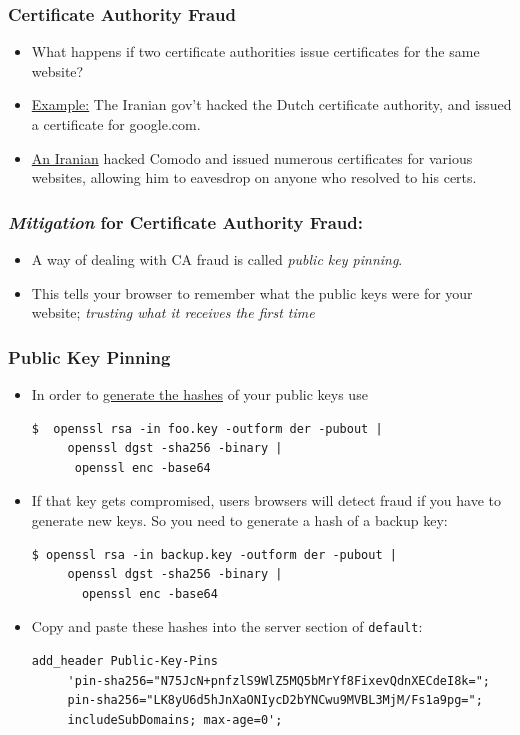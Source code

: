 \documentclass[9pt]{beamer}
\begin{document}
\begin{frame}[fragile]
\frametitle{Certificate Authority Fraud}
\begin{itemize}
\item What happens if two certificate authorities issue certificates for the same website?
\pause
\item \href{http://arstechnica.com/security/2011/08/earlier-this-year-an-iranian/}{Example:} The Iranian gov't hacked the Dutch certificate authority, and issued a certificate for google.com.
\pause
\item \href{http://arstechnica.com/security/2011/03/independent-iranian-hacker-claims-responsibility-for-comodo-hack/}{An Iranian} hacked Comodo and issued numerous certificates for various websites, allowing him to eavesdrop on anyone who resolved to his certs.
\end{itemize}
\end{frame}

\begin{frame}[fragile]
\frametitle{\emph{Mitigation} for Certificate Authority Fraud:}
\begin{itemize}
\item A way of dealing with CA fraud is called \emph{public key pinning}.
\pause
\item This tells your browser to remember what the public keys were for your website; \emph{trusting what it receives the first time}
\end{itemize}
\end{frame}

\begin{frame}[fragile]
\frametitle{Public Key Pinning}
\begin{itemize}
\item In order to \href{https://developer.mozilla.org/en-US/docs/Web/Security/Public_Key_Pinning}{generate the hashes} of your public keys use
\begin{verbatim}
$  openssl rsa -in foo.key -outform der -pubout |
     openssl dgst -sha256 -binary |
      openssl enc -base64
\end{verbatim}
\pause 
\item If that key gets compromised, users browsers will detect fraud if you have to generate new keys. So you need to generate a hash of a backup key:
\begin{verbatim}
$ openssl rsa -in backup.key -outform der -pubout | 
     openssl dgst -sha256 -binary |
       openssl enc -base64
\end{verbatim}
\pause
\item Copy and paste these hashes into the server section of \texttt{default}:
\begin{verbatim}
add_header Public-Key-Pins 
     'pin-sha256="N75JcN+pnfzlS9WlZ5MQ5bMrYf8FixevQdnXECdeI8k="; 
     pin-sha256="LK8yU6d5hJnXaONIycD2bYNCwu9MVBL3MjM/Fs1a9pg="; 
     includeSubDomains; max-age=0';
\end{verbatim}
\end{itemize}
\end{frame}
\end{document}
